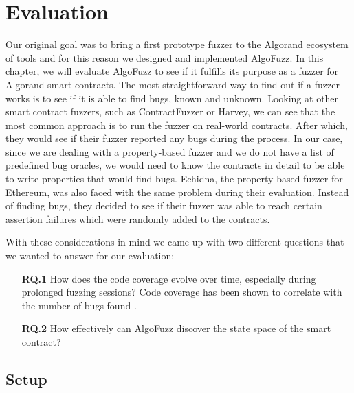 
\chapter{Evaluation}\label{chapter:evaluation}
Our original goal was to bring a first prototype fuzzer to the Algorand ecosystem of tools and for this reason we designed and implemented AlgoFuzz.
In this chapter, we will evaluate AlgoFuzz to see if it fulfills its purpose as a fuzzer for Algorand smart contracts.
The most straightforward way to find out if a fuzzer works is to see if it is able to find bugs, known and unknown.
Looking at other smart contract fuzzers, such as ContractFuzzer or Harvey, we can see that the most common approach is to run the fuzzer on real-world contracts.
After which, they would see if their fuzzer reported any bugs during the process.
In our case, since we are dealing with a property-based fuzzer and we do not have a list of predefined bug oracles, we would need to know the contracts in detail to be able to write properties that would find bugs.
Echidna, the property-based fuzzer for Ethereum, was also faced with the same problem during their evaluation.
Instead of finding bugs, they decided to see if their fuzzer was able to reach certain assertion failures which were randomly added to the contracts.

With these considerations in mind we came up with two different questions that we wanted to answer for our evaluation:
\begin{enumerate}
    \item[\textbf{RQ.1}] How does the code coverage evolve over time, especially during prolonged fuzzing sessions? Code coverage has been shown to correlate with the number of bugs found \cite{kochhar_code_2015}.

    \item[\textbf{RQ.2}] How effectively can AlgoFuzz discover the state space of the smart contract?
\end{enumerate}

\section{Setup}

